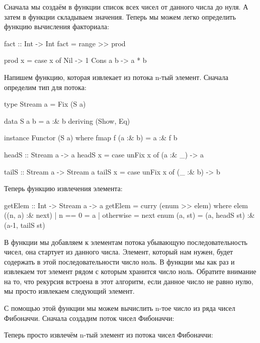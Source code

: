 Сначала мы создаём в функции  список всех чисел от данного
числа до нуля. А затем в функции  складываем значения. Теперь мы
можем легко определить функцию вычисления факториала:


\begin{code}
fact :: Int -> Int
fact = range >> prod
    
prod x = case x of
    Nil      -> 1 
    Cons a b -> a * b
\end{code}

Напишем функцию, которая извлекает из потока n-тый элемент. Сначала
определим тип для потока:


\begin{code}
type Stream a = Fix (S a)

data S a b = a :& b
    deriving (Show, Eq)

instance Functor (S a) where
    fmap f (a :& b) = a :& f b  


headS :: Stream a -> a
headS x = case unFix x of
    (a :& _) -> a


tailS :: Stream a -> Stream a
tailS x = case unFix x of
    (_ :& b) -> b
\end{code}

Теперь функцию извлечения элемента:


\begin{code}
getElem :: Int -> Stream a -> a
getElem = curry (enum >> elem) 
    where elem ((n, a) :& next) 
                | n == 0    = a
                | otherwise = next
          enum (a, st) = (a, headS st) :& (a-1, tailS st)
\end{code}

В функции  мы добавляем к элементам потока убывающую
последовательность чисел, она стартует из данного числа. Элемент,
который нам нужен, будет содержать в этой последовательности число ноль.
В функции  мы как раз и извлекаем тот элемент рядом с которым
хранится число ноль. Обратите внимание на то, что рекурсия встроена в
этот алгоритм, если данное число не равно нулю, мы просто извлекаем
следующий элемент.

С помощью этой функции мы можем вычислить n-тое число из ряда чисел
Фибоначчи. Сначала создадим поток чисел Фибоначчи:



Теперь просто извлечём n-тый элемент из потока чисел Фибоначчи:


